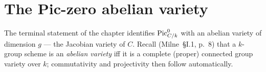\section{The Pic-zero abelian variety}
\label{sec:pic0_abelian_variety}

The terminal statement of the chapter identifies \(\operatorname{Pic}^0_{C/k}\) with
an abelian variety of dimension \(g\) --- the Jacobian variety of \(C\).
Recall (Milne~\S I.1, p.~8) that a \(k\)-group scheme is an
\emph{abelian variety} iff it is a complete (proper) connected group
variety over \(k\); commutativity and projectivity then follow
automatically.


